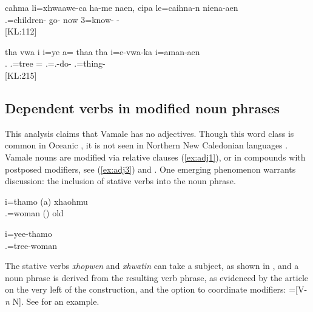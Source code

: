 \ea \label{ex:aen1}
\gll cahma li=xhwaawe-ca ha-me naen, cipa le=caihna-n niena-aen\\
  .=children- go- now  3=know- -\\
\glt {} {[KL:112]}
\z

\ea \label{ex:aen2}
\gll tha vwa i i=ye a= thaa tha i=e-vwa-ka i=aman-aen\\
   . .=tree =   .=.-do- .=thing-\\
\glt {} {[KL:215]}
\z

\subsection{Dependent verbs in modified noun phrases}
\label{sec:adj}

This analysis claims that Vamale has no adjectives. Though this word class is common in Oceanic %
\parencite[497]{ross_morphosyntactic_2004}, it is not seen in Northern New Caledonian languages \parencites[106]{bril_nelemwa_2002}[47]{ozanne-rivierre_nyelayu_1998}. Vamale nouns are modified via relative clauses (\ref{ex:adj1}), or in compounds with postposed modifiers, see (\ref{ex:adj3}) and . One emerging phenomenon warrants discussion: the inclusion of stative verbs into the noun phrase. 


	\ea
	\label{ex:adj1}
	\gll i=thamo (a) xhaohmu\\
	 .=woman () old\\
	\glt {}
	\z
	
	
	\ea\label{ex:adj3}
	\gll i=yee-thamo\\
	 .=tree-woman\\
	\glt {}
		\z


The stative verbs \textit{xhopwen}  and \textit{xhwatin}  can take a subject, as shown in , and a noun phrase is derived from the resulting verb phrase, as evidenced by the article on the very left of the construction, and the option to coordinate modifiers: ={[}V-\textit{n}\textsubscript{}  N\textsubscript{}]. See  for an example.%

